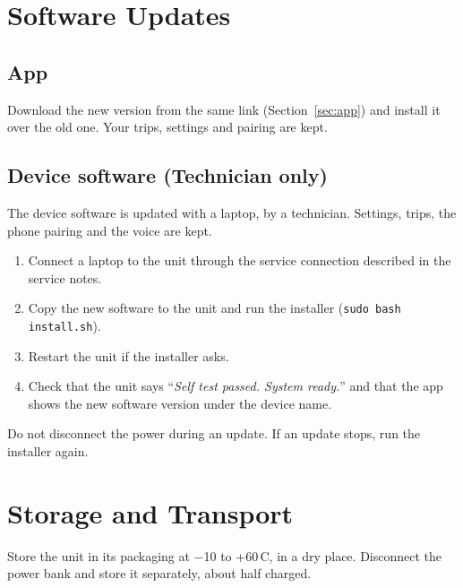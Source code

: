 \documentclass[11pt,a4paper,oneside]{report}
\newcommand{\say}[1]{``\textit{#1}''}
\begin{document}
\section{Software Updates}\label{sec:fw}
\subsection*{App}
Download the new version from the same link (Section~\ref{sec:app}) and install it over the old one. Your trips, settings and pairing are kept.
\subsection*{Device software (Technician only)}
The device software is updated with a laptop, by a technician. Settings, trips, the phone pairing and the voice are kept.
\begin{enumerate}[leftmargin=*]
\item Connect a laptop to the unit through the service connection described in the service notes.
\item Copy the new software to the unit and run the installer (\texttt{sudo bash install.sh}).
\item Restart the unit if the installer asks.
\item Check that the unit says \say{Self test passed. System ready.} and that the app shows the new software version under the device name.
\end{enumerate}
\begin{notice}Do not disconnect the power during an update. If an update stops, run the installer again.\end{notice}

\section{Storage and Transport}
Store the unit in its packaging at $-$10 to +60\,\textdegree C, in a dry place. Disconnect the power bank and store it separately, about half charged.
\end{document}
